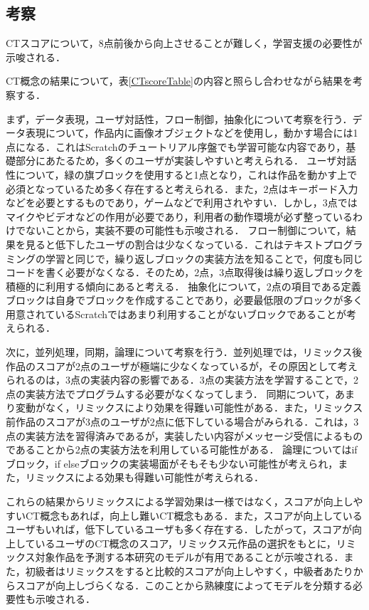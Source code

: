 \documentclass[submit,techrep,noauthor]{ipsj}
\begin{document}
\subsection{考察}

CTスコアについて，8点前後から向上させることが難しく，学習支援の必要性が示唆される．

CT概念の結果について，表\ref{CTscoreTable}の内容と照らし合わせながら結果を考察する．

まず，データ表現，ユーザ対話性，フロー制御，抽象化について考察を行う．データ表現について，作品内に画像オブジェクトなどを使用し，動かす場合には1点になる．これはScratchのチュートリアル序盤でも学習可能な内容であり，基礎部分にあたるため，多くのユーザが実装しやすいと考えられる．
ユーザ対話性について，緑の旗ブロックを使用すると1点となり，これは作品を動かす上で必須となっているため多く存在すると考えられる．また，2点はキーボード入力などを必要とするものであり，ゲームなどで利用されやすい．しかし，3点ではマイクやビデオなどの作用が必要であり，利用者の動作環境が必ず整っているわけでないことから，実装不要の可能性も示唆される．
フロー制御について，結果を見ると低下したユーザの割合は少なくなっている．これはテキストプログラミングの学習と同じで，繰り返しブロックの実装方法を知ることで，何度も同じコードを書く必要がなくなる．そのため，2点，3点取得後は繰り返しブロックを積極的に利用する傾向にあると考える．
抽象化について，2点の項目である定義ブロックは自身でブロックを作成することであり，必要最低限のブロックが多く用意されているScratchではあまり利用することがないブロックであることが考えられる．

次に，並列処理，同期，論理について考察を行う．並列処理では，リミックス後作品のスコアが2点のユーザが極端に少なくなっているが，その原因として考えられるのは，3点の実装内容の影響である．3点の実装方法を学習することで，2点の実装方法でプログラムする必要がなくなってしまう．
同期について，あまり変動がなく，リミックスにより効果を得難い可能性がある．また，リミックス前作品のスコアが3点のユーザが2点に低下している場合がみられる．これは，3点の実装方法を習得済みであるが，実装したい内容がメッセージ受信によるものであることから2点の実装方法を利用している可能性がある．
論理についてはifブロック，if elseブロックの実装場面がそもそも少ない可能性が考えられ，また，リミックスによる効果も得難い可能性が考えられる．

これらの結果からリミックスによる学習効果は一様ではなく，スコアが向上しやすいCT概念もあれば，向上し難いCT概念もある．また，スコアが向上しているユーザもいれば，低下しているユーザも多く存在する．したがって，スコアが向上しているユーザのCT概念のスコア，リミックス元作品の選択をもとに，リミックス対象作品を予測する本研究のモデルが有用であることが示唆される．また，初級者はリミックスをすると比較的スコアが向上しやすく，中級者あたりからスコアが向上しづらくなる．このことから熟練度によってモデルを分類する必要性も示唆される．
\end{document}
